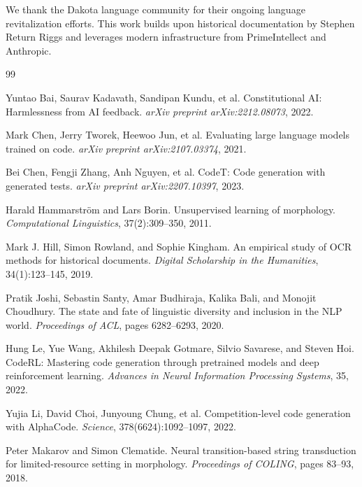 \documentclass{article}
\begin{document}
We thank the Dakota language community for their ongoing language revitalization efforts. This work builds upon historical documentation by Stephen Return Riggs and leverages modern infrastructure from PrimeIntellect and Anthropic.


\begin{thebibliography}{99}

Yuntao Bai, Saurav Kadavath, Sandipan Kundu, et al.
\newblock Constitutional AI: Harmlessness from AI feedback.
\newblock \emph{arXiv preprint arXiv:2212.08073}, 2022.

Mark Chen, Jerry Tworek, Heewoo Jun, et al.
\newblock Evaluating large language models trained on code.
\newblock \emph{arXiv preprint arXiv:2107.03374}, 2021.

Bei Chen, Fengji Zhang, Anh Nguyen, et al.
\newblock CodeT: Code generation with generated tests.
\newblock \emph{arXiv preprint arXiv:2207.10397}, 2023.

Harald Hammarstr{\"o}m and Lars Borin.
\newblock Unsupervised learning of morphology.
\newblock \emph{Computational Linguistics}, 37(2):309--350, 2011.

Mark J. Hill, Simon Rowland, and Sophie Kingham.
\newblock An empirical study of OCR methods for historical documents.
\newblock \emph{Digital Scholarship in the Humanities}, 34(1):123--145, 2019.

Pratik Joshi, Sebastin Santy, Amar Budhiraja, Kalika Bali, and Monojit Choudhury.
\newblock The state and fate of linguistic diversity and inclusion in the NLP world.
\newblock \emph{Proceedings of ACL}, pages 6282--6293, 2020.

Hung Le, Yue Wang, Akhilesh Deepak Gotmare, Silvio Savarese, and Steven Hoi.
\newblock CodeRL: Mastering code generation through pretrained models and deep reinforcement learning.
\newblock \emph{Advances in Neural Information Processing Systems}, 35, 2022.

Yujia Li, David Choi, Junyoung Chung, et al.
\newblock Competition-level code generation with AlphaCode.
\newblock \emph{Science}, 378(6624):1092--1097, 2022.

Peter Makarov and Simon Clematide.
\newblock Neural transition-based string transduction for limited-resource setting in morphology.
\newblock \emph{Proceedings of COLING}, pages 83--93, 2018.


\end{thebibliography}
\end{document}
